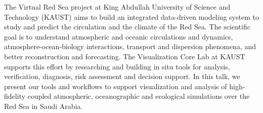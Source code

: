 \license


The Virtual Red Sea project at King Abdullah University of Science and Technology (KAUST) aims to build an integrated data-driven modeling system to study and predict the circulation and the climate of the Red Sea. The scientific goal is to understand atmospheric and oceanic circulations and dynamics, 
atmosphere-ocean-biology interactions, transport and dispersion phenomena, and better reconstruction and forecasting. The Visualization Core Lab at KAUST supports this effort by researching and building in situ tools for analysis, verification, diagnosis, risk assessment and decision support. In this talk, we present our tools and workflows to support visualization and analysis of high-fidelity coupled atmospheric, oceanographic and ecological simulations over the Red Sea in Saudi Arabia.

